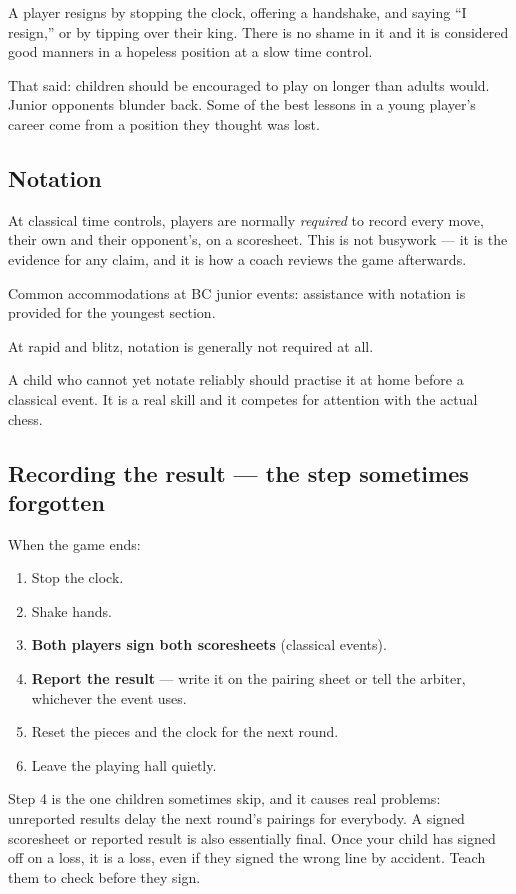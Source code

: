 \documentclass[10pt,letterpaper]{article}
\begin{document}
A player resigns by stopping the clock, offering a handshake, and saying ``I
resign,'' or by tipping over their king. There is no shame in it and it is
considered good manners in a hopeless position at a slow time control.

That said: children should be encouraged to play on longer than adults would.
Junior opponents blunder back. Some of the best lessons in a young player's
career come from a position they thought was lost.

\subsection{Notation}

At classical time controls, players are normally \emph{required} to record every
move, their own and their opponent's, on a scoresheet. This is not busywork ---
it is the evidence for any claim, and it is how a coach reviews the game
afterwards.

Common accommodations at BC junior events: assistance with notation is provided
for the youngest section.

At rapid and blitz, notation is generally not
required at all.

A child who cannot yet notate reliably should practise it at home before a
classical event. It is a real skill and it competes for attention with the
actual chess.

\subsection{Recording the result --- the step sometimes forgotten}

When the game ends:

\begin{enumerate}
  \item Stop the clock.
  \item Shake hands.
  \item \textbf{Both players sign both scoresheets} (classical events).
  \item \textbf{Report the result} --- write it on the pairing sheet or tell
        the arbiter, whichever the event uses.
  \item Reset the pieces and the clock for the next round.
  \item Leave the playing hall quietly.
\end{enumerate}

Step 4 is the one children sometimes skip, and it causes real problems: unreported results
delay the next round's pairings for everybody. A signed scoresheet or reported
result is also essentially final. Once your child has signed off on a loss, it
is a loss, even if they signed the wrong line by accident. Teach them to check
before they sign.
\end{document}

